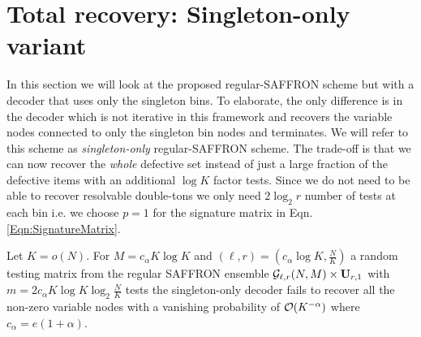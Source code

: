 \section{Total recovery: Singleton-only variant}
\label{Sec:Singleton-only}
 In this section we will look at the proposed regular-SAFFRON scheme but with a decoder that uses only the singleton bins. To elaborate, the only difference is in the decoder which is not iterative in this framework and recovers the variable nodes connected to only the singleton bin nodes and terminates. We will refer to this scheme as \textit{singleton-only} regular-SAFFRON scheme. The trade-off is that we can now recover the \textit{whole} defective set instead of just a large fraction of the defective items with an additional $\log K$ factor tests. Since we do not need to be able to recover resolvable double-tons we only need $2\log_2 r$ number of tests at each bin i.e. we choose $p=1$ for the signature matrix in Eqn. \eqref{Eqn:SignatureMatrix}.
\begin{theorem}
Let $K=o(N)$. For $M=c_\alpha K \log K$ and $(\ell,r)=(c_\alpha \log K,\frac{N}{K})$ a random testing matrix from the regular SAFFRON ensemble $\mathcal{G}_{\ell,r}(N,M)\times \mathbf{U}_{r,1}$ with $m=2c_\alpha K\log K \log_2 \frac{N}{K}$ tests the singleton-only decoder fails to recover all the non-zero variable nodes with a vanishing probability of $\mathcal{O}(K^{-\alpha})$ where $c_\alpha=e(1+\alpha)$.
\end{theorem}
